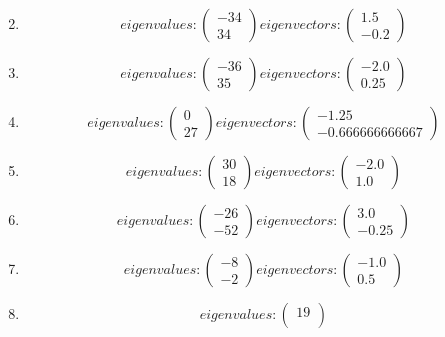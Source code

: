 \documentclass{article}%
\begin{document}
\begin{enumerate}[label=\arabic*)]
\[\]%
\item%
\[%
eigenvalues: \begin{pmatrix}%
-34\\%
34%
\end{pmatrix} eigenvectors: \begin{pmatrix}%
1.5\\%
-0.2%
\end{pmatrix}%
\]%
\item%
\[%
eigenvalues: \begin{pmatrix}%
-36\\%
35%
\end{pmatrix} eigenvectors: \begin{pmatrix}%
-2.0\\%
0.25%
\end{pmatrix}%
\]%
\item%
\[%
eigenvalues: \begin{pmatrix}%
0\\%
27%
\end{pmatrix} eigenvectors: \begin{pmatrix}%
-1.25\\%
-0.666666666667%
\end{pmatrix}%
\]%
\item%
\[%
eigenvalues: \begin{pmatrix}%
30\\%
18%
\end{pmatrix} eigenvectors: \begin{pmatrix}%
-2.0\\%
1.0%
\end{pmatrix}%
\]%
\item%
\[%
eigenvalues: \begin{pmatrix}%
-26\\%
-52%
\end{pmatrix} eigenvectors: \begin{pmatrix}%
3.0\\%
-0.25%
\end{pmatrix}%
\]%
\item%
\[%
eigenvalues: \begin{pmatrix}%
-8\\%
-2%
\end{pmatrix} eigenvectors: \begin{pmatrix}%
-1.0\\%
0.5%
\end{pmatrix}%
\]%
\item%
\[%
eigenvalues: \begin{pmatrix}%
19\\%

\end{pmatrix}\]
\end{enumerate}
\end{document}
